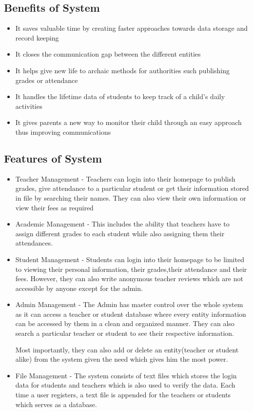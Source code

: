 \documentclass[a4paper,12pt]{article}
\begin{document}
\subsection{Benefits of System}
\enlargethispage{\baselineskip}
\begin{itemize}
    \item It saves valuable time by creating faster approaches towards data storage and record keeping
    \item It closes the communication gap between the different entities
    \item It helps give new life to archaic methods for authorities such publishing grades or attendance
    \item It handles the lifetime data of students to keep track of a child's daily activities 
    \baselineskip
    \item It gives parents a new way to monitor their child through an easy approach thus improving communications
\end{itemize}


\subsection{Features of System}
\enlargethispage{\baselineskip}
\begin{itemize}
    \item Teacher Management - Teachers can login into their homepage to publish grades, give attendance to a particular student or get their information stored in file by searching their names. They can also view their own information or view their fees as required
    \item Academic Management - This includes the ability that teachers have to assign different grades to each student while also assigning them their attendances.
    \item Student Management - Students can login into their homepage to be limited to viewing their personal information, their grades,their attendance and their fees. However, they can also write anonymous teacher reviews which are not accessible by anyone except for the admin.
    \item Admin Management - The Admin has master control over the whole system as it can access a teacher or student database where every entity information can be accessed by them in a clean and organized manner. They can also search a particular teacher or student to see their respective information. \par Most importantly, they can also add or delete an entity(teacher or student alike) from the system given the need which gives him the most power.
    \item File Management - The system consists of text files which stores the login data for students and teachers which is also used to verify the data. Each time a user registers, a text file is appended for the teachers or students which serves as a database. 
\end{itemize}
\newpage
\end{document}
